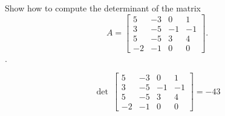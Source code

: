
\begin{exerciseStatement}


Show how to compute the determinant of the matrix \[A= \left[\begin{array}{cccc}
5 & -3 & 0 & 1 \\
3 & -5 & -1 & -1 \\
5 & -5 & 3 & 4 \\
-2 & -1 & 0 & 0
\end{array}\right] .\].


\end{exerciseStatement}
    
\begin{exerciseAnswer} 
\[\operatorname{det}\  \left[\begin{array}{cccc}
5 & -3 & 0 & 1 \\
3 & -5 & -1 & -1 \\
5 & -5 & 3 & 4 \\
-2 & -1 & 0 & 0
\end{array}\right] = -43 \]
\end{exerciseAnswer}
    
